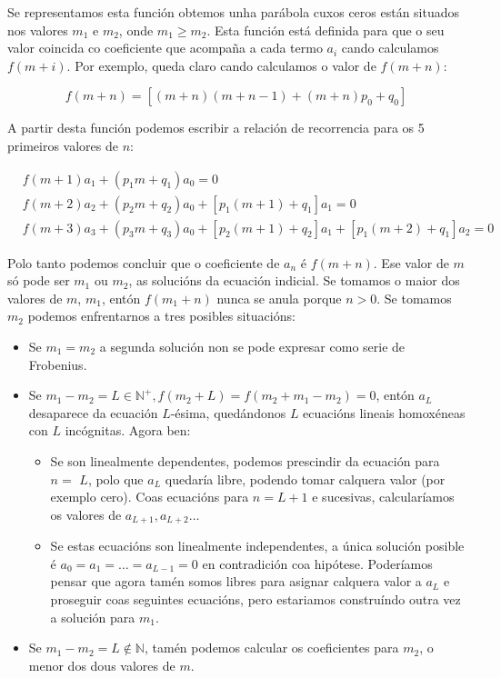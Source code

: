 \documentclass[a4paper,12pt,titlepage]{article}
\begin{document}
Se representamos esta función obtemos unha parábola cuxos ceros están situados nos valores $m_1$ e $m_2$, onde $m_1\geq m_2$. Esta función está definida para que o seu valor coincida co coeficiente que acompaña a cada termo $a_i$ cando calculamos $f(m+i)$. Por exemplo, queda claro cando calculamos o valor de $f(m+n)$:

\begin{equation*}
    f(m+n) = \left[(m+n)(m+n-1)+(m+n) p_{0}+q_{0}\right]
\end{equation*}

A partir desta función podemos escribir a relación de recorrencia para os 5 primeiros valores de $n$:

$$
\begin{aligned}
& f(m+1) a_{1}+\left(p_{1} m+q_{1}\right) a_{0}=0 \\
& f(m+2) a_{2}+\left(p_{2} m+q_{2}\right) a_{0}+\left[p_{1}(m+1)+q_{1}\right] a_{1}=0 \\
& f(m+3) a_{3}+\left(p_{3} m+q_{3}\right) a_{0}+\left[p_{2}(m+1)+q_{2}\right] a_{1}+\left[p_{1}(m+2)+q_{1}\right] a_{2}=0
\end{aligned}
$$

Polo tanto podemos concluir que o coeficiente de $a_n$ é $f(m+n)$. Ese valor de $m$ só pode ser $m_1$ ou $m_2$, as solucións da ecuación indicial. Se tomamos o maior dos valores de $m$, $m_1$, entón $f(m_1+n)$ nunca se anula porque $n>0$. Se tomamos $m_2$ podemos enfrentarnos a tres posibles situacións:

\begin{itemize}
    \item Se $m_{1}=m_{2}$ a segunda solución non se pode expresar como serie de Frobenius.
    \item Se $m_{1}-m_{2}=L \in \mathbb{N}^{+}, f\left(m_{2}+L\right)=f\left(m_{2}+m_{1}-m_{2}\right)=0$, entón $a_{L}$ desaparece da ecuación $L$-ésima, quedándonos $L$ ecuacións lineais homoxéneas con $L$ incógnitas. Agora ben: 
    \begin{itemize}
        \item Se son linealmente dependentes, podemos prescindir da ecuación para $n=$ $L$, polo que $a_{L}$ quedaría libre, podendo tomar calquera valor (por exemplo cero). Coas ecuacións para $n=L+1$ e sucesivas, calcularíamos os valores de $a_{L+1}, a_{L+2} \ldots$
        \item Se estas ecuacións son linealmente independentes, a única solución posible é $a_{0}=a_{1}=\ldots=a_{L-1}=0$ en contradición coa hipótese. Poderíamos pensar que agora tamén somos libres para asignar calquera valor a $a_{L}$ e proseguir coas seguintes ecuacións, pero estariamos construíndo outra vez a solución para $m_{1}$.
    \end{itemize}
    \item Se $m_{1}-m_{2}=L \notin \mathbb{N}$, tamén podemos calcular os coeficientes para $m_{2}$, o menor dos dous valores de $m$.
\end{itemize}
\end{document}

